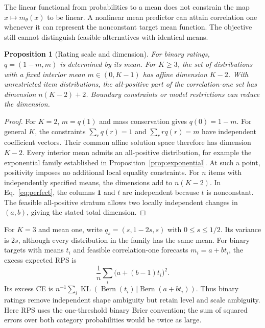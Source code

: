 \documentclass[11pt,letterpaper]{article}
\newtheorem{proposition}{Proposition}
\newcommand{\KL}{\operatorname{KL}}
\begin{document}
The linear functional from probabilities to a mean does not constrain the map $x\mapsto m_\theta(x)$ to be linear.
A nonlinear mean predictor can attain correlation one whenever it can represent the nonconstant target mean function.
The objective still cannot distinguish feasible alternatives with identical means.

\begin{proposition}[Rating scale and dimension]\label{prop:dimension}
For binary ratings, $q=(1-m,m)$ is determined by its mean.
For $K\ge3$, the set of distributions with a fixed interior mean $m\in(0,K-1)$ has affine dimension $K-2$.
With unrestricted item distributions, the all-positive part of the correlation-one set has dimension $n(K-2)+2$.
Boundary constraints or model restrictions can reduce the dimension.
\end{proposition}
\begin{proof}
For $K=2$, $m=q(1)$ and mass conservation gives $q(0)=1-m$.
For general $K$, the constraints $\sum_r q(r)=1$ and $\sum_r r q(r)=m$ have independent coefficient vectors.
Their common affine solution space therefore has dimension $K-2$.
Every interior mean admits an all-positive distribution, for example the exponential family established in Proposition~\ref{prop:exponential}.
At such a point, positivity imposes no additional local equality constraints.
For $n$ items with independently specified means, the dimensions add to $n(K-2)$.
In Eq.~\eqref{eq:perfect}, the columns $\mathbf1$ and $t$ are independent because $t$ is nonconstant.
The feasible all-positive stratum allows two locally independent changes in $(a,b)$, giving the stated total dimension.
\end{proof}

For $K=3$ and mean one, write $q_s=(s,1-2s,s)$ with $0\le s\le1/2$.
Its variance is $2s$, although every distribution in the family has the same mean.
For binary targets with means $t_i$ and feasible correlation-one forecasts $m_i=a+bt_i$, the excess expected RPS is
\[
 \frac1n\sum_i\big(a+(b-1)t_i\big)^2.
\]
Its excess CE is $n^{-1}\sum_i\KL(\operatorname{Bern}(t_i)\Vert\operatorname{Bern}(a+bt_i))$.
Thus binary ratings remove independent shape ambiguity but retain level and scale ambiguity.
Here RPS uses the one-threshold binary Brier convention; the sum of squared errors over both category probabilities would be twice as large.
\end{document}
